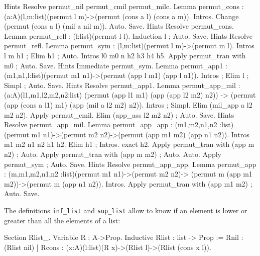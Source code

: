 \begin{coq_eval}
Hints Resolve permut_nil permut_cmil permut_milc.
Lemma permut_cons : (a:A)(l,m:list)(permut l m)->(permut (cons a l) (cons a m)).
        Intros.
        Change (permut (cons a l) (mil a nil m)).
        Auto.
Save.
Hints Resolve permut_cons.
Lemma permut_refl : (l:list)(permut l l).
        Induction l ; Auto.
Save.
Hints Resolve permut_refl.
Lemma permut_sym : (l,m:list)(permut l m)->(permut m l).
        Intros l m h1 ; Elim h1 ; Auto.
        Intros l0 m0 n h2 h3 h4 h5.
        Apply permut_tran with m0 ; Auto.
Save.
Hints Immediate permut_sym.
Lemma permut_app1 : (m1,n1,l:list)(permut m1 n1)->(permut (app l m1) (app l n1)).
        Intros ; Elim l ; Simpl ; Auto.
Save.
Hints Resolve permut_app1.
Lemma permut_app_mil : (a:A)(l1,m1,l2,m2,n2:list)
     (permut (app l1 m1) (app (app l2 m2) n2))
                -> (permut (app (cons a l1) m1) (app (mil a l2 m2) n2)).
        Intros ; Simpl.
        Elim (mil_app a l2 m2 n2).
        Apply permut_cmil.
        Elim (app_ass l2 m2 n2) ; Auto.
Save.
Hints Resolve permut_app_mil.
Lemma permut_app_app : (m1,m2,n1,n2 :list)
     (permut m1 n1)->(permut m2 n2)->(permut (app m1 m2) (app n1 n2)).
        Intros m1 m2 n1 n2 h1 h2.
        Elim h1 ; Intros.
        exact h2.
        Apply permut_tran with (app m n2) ; Auto.
        Apply permut_tran with (app m m2) ; Auto.
        Auto.
        Apply permut_sym ; Auto.
Save.
Hints Resolve permut_app_app.
Lemma permut_app : (m,m1,m2,n1,n2 :list)(permut m1 n1)->(permut m2 n2)->
     (permut m (app m1 m2))->(permut m (app n1 n2)).
        Intros.
        Apply permut_tran with (app m1 m2) ; Auto.
Save.
\end{coq_eval}
The definitions \verb=inf_list= and \verb=sup_list= allow to know if
an element is lower or greater than all the elements of a list:
\begin{coq_example*}
Section Rlist_.
Variable R : A->Prop.
Inductive Rlist  : list -> Prop :=
    Rnil : (Rlist nil)
  | Rcons : (x:A)(l:list)(R x)->(Rlist l)->(Rlist (cons x l)).
\end{coq_example*}
